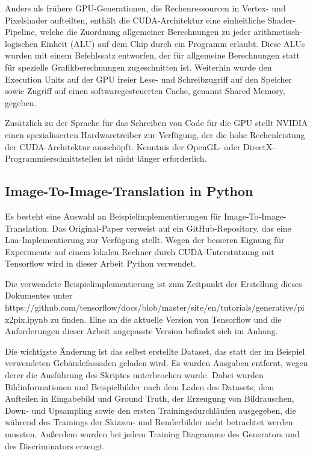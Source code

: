 Anders als frühere GPU-Generationen, die Rechenressourcen in Vertex- und Pixelshader aufteilten, enthält die CUDA-Architektur eine einheitliche Shader-Pipeline, welche die Zuordnung allgemeiner Berechnungen zu jeder arithmetisch-logischen Einheit (ALU) auf dem Chip durch ein Programm erlaubt. Diese ALUs wurden mit einem Befehlssatz entworfen, der für allgemeine Berechnungen statt für spezielle Grafikberechnungen zugeschnitten ist. Weiterhin wurde den Execution Units auf der GPU freier Lese- und Schreibzugriff auf den Speicher sowie Zugriff auf einen softwaregesteuerten Cache, genannt Shared Memory, gegeben. \cite{sanders2010cuda}

Zusätzlich zu der Sprache für das Schreiben von Code für die GPU stellt NVIDIA einen spezialisierten Hardwaretreiber zur Verfügung, der die hohe Rechenleistung der CUDA-Architektur ausschöpft. Kenntnis der OpenGL- oder DirectX-Programmierschnittstellen ist nicht länger erforderlich. \cite{sanders2010cuda}

\subsection{Image-To-Image-Translation in Python}
Es besteht eine Auswahl an Beispielimplementierungen für Image-To-Image-Translation. Das Original-Paper verweist auf ein GitHub-Repository, das eine Lua-Implementierung zur Verfügung stellt. Wegen der besseren Eignung für Experimente auf einem lokalen Rechner durch CUDA-Unterstützung mit Tensorflow wird in dieser Arbeit Python verwendet.

Die verwendete Beispielimplementierung ist zum Zeitpunkt der Erstellung dieses Dokumentes unter https://github.com/tensorflow/docs/blob/master/site/en/tutorials/generative/pix2pix.ipynb zu finden. Eine an die aktuelle Version von Tensorflow und die Anforderungen dieser Arbeit angepasste Version befindet sich im Anhang.

Die wichtigste Änderung ist das selbst erstellte Dataset, das statt der im Beispiel verwendeten Gebäudefassaden geladen wird. Es wurden Ausgaben entfernt, wegen derer die Ausführung des Skriptes unterbrochen wurde. Dabei wurden Bildinformationen und Beispielbilder nach dem Laden des Datasets, dem Aufteilen in Eingabebild und Ground Truth, der Erzeugung von Bildrauschen, Down- und Upsampling sowie den ersten Trainingsdurchläufen ausgegeben, die während des Trainings der Skizzen- und Renderbilder nicht betrachtet werden mussten. Außerdem wurden bei jedem Training Diagramme des Generators und des Discriminators erzeugt.


